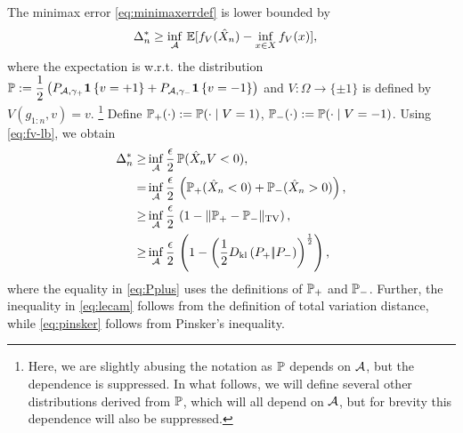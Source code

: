 The minimax error \eqref{eq:minimaxerrdef} is lower bounded by
\begin{align}
\MoveEqLeft 
\Delta_n^{*} %
  \ge  \inf_{\A} \,  \E[f_V(\hat X_n) - \inf_{x \in X}
  f_V(x)],\label{eq:avg-bd}
  \end{align}
where the expectation is w.r.t. the distribution $\P:= \dfrac{1}{2} \left(P_{\A, \gamma_+} \indic{v=+1} + P_{\A, \gamma_-}\indic{v=-1}\right)$ and $V: \Omega \to \{\pm 1 \}$ is defined by $V(g_{1:n},v) = v$.%
\footnote{Here, we are slightly abusing the notation as $\P$ depends on $\A$, but the dependence is suppressed.
In what follows, we will define several other distributions derived from $\P$, which will all depend on $\A$, but
for brevity this dependence will also be suppressed.}
Define $\P_{+}(\cdot) := \P(\cdot\mid V=1)$, $\P_{-}(\cdot) := \P(\cdot\mid
V=-1)$. 
Using \eqref{eq:fv-lb}, we obtain
\begin{align}
\Delta_n^{*}  \ge & \inf_{\A} \dfrac{\epsilon}{2}\,  \P(\hat X_n V < 0), \label{eq:strong-convex-bd}\\
  = & \inf_{\A} \dfrac{\epsilon }{2} \, \left(\P_{+}(\hat X_n < 0) + \P_{-}(\hat X_n > 0)\right), \label{eq:Pplus}\\
  \ge &\inf_{\A} \dfrac{\epsilon }{2} \,\left(1 - \tvnorm{\P_{+}- \P_{-}}\right), \label{eq:lecam}\\
  \ge &\inf_{\A} \dfrac{\epsilon }{2}  \,\left( 1 - \left(\frac12\dkl{P_{+}}{P_{-}}\right)^{\frac{1}{2}}\right), \label{eq:pinsker}
\end{align}
where 
the equality in \eqref{eq:Pplus} uses the definitions of $\P_+$ and $\P_-$.  
Further, the inequality in \eqref{eq:lecam} follows from the definition of total variation distance, while \eqref{eq:pinsker} follows from Pinsker's inequality. %


